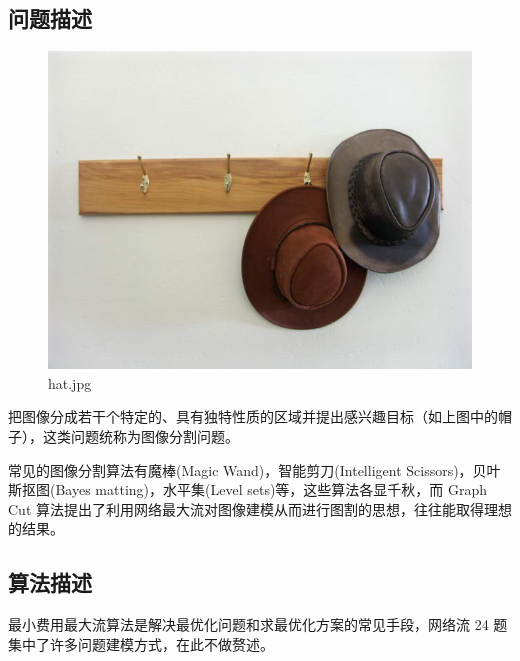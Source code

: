 \documentclass[lang=cn,11pt,a4paper]{elegantpaper}
\begin{document}
\subsection{问题描述}
\begin{figure}[ht]
	\centering
	\includegraphics[width=0.5\linewidth]{image/hat.jpg}
	\caption{hat.jpg}
\end{figure}

把图像分成若干个特定的、具有独特性质的区域并提出感兴趣目标（如上图中的帽子），这类问题统称为图像分割问题。

常见的图像分割算法有魔棒(Magic Wand)，智能剪刀(Intelligent Scissors)，贝叶斯抠图(Bayes matting)，水平集(Level sets)等，这些算法各显千秋，而 Graph Cut 算法提出了利用网络最大流对图像建模从而进行图割的思想，往往能取得理想的结果。

\subsection{算法描述}

最小费用最大流算法是解决最优化问题和求最优化方案的常见手段，网络流 24 题集中了许多问题建模方式，在此不做赘述。
\end{document}
